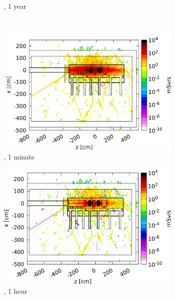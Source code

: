\begin{figure}[!h]
\begin{subfigure}[b]{0.32\textwidth}
   \caption{\designone, 1 year}
   \end{subfigure} 
   \hfill
   \begin{minipage}{0.32\textwidth}
   \hfill
    \end{minipage}
   \\
     \begin{subfigure}[b]{0.32\textwidth}
   \centering
    \includegraphics[width=\textwidth]{Figures/BeamDump/Design2_1.png}
   \caption{\designtwo, 1 minute}
   \end{subfigure}
   \hfill
    \begin{subfigure}[b]{0.32\textwidth}
   \centering
    \includegraphics[width=\textwidth]{Figures/BeamDump/Design2_2.png}
   \caption{\designtwo, 1 hour}
   \end{subfigure}
      \hfill
     \begin{subfigure}[b]{0.32\textwidth}

\end{subfigure}
\end{figure}
